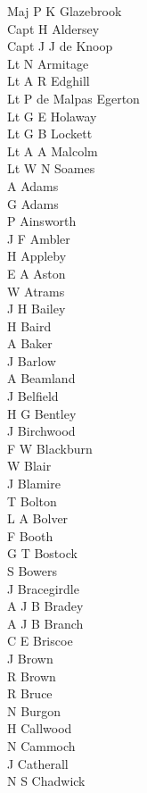 \begin{multicols}{3}
  \small
  \noindent
  Maj P K Glazebrook \\
  Capt H Aldersey \\
  Capt J J de Knoop \\
  Lt N Armitage \\
  Lt A R Edghill \\
  Lt P de Malpas Egerton \\
  Lt G E Holaway \\
  Lt G B Lockett \\
  Lt A A Malcolm \\
  Lt W N Soames \\
  A Adams \\
  G Adams \\
  P Ainsworth \\
  J F Ambler \\
  H Appleby \\
  E A Aston \\
  W Atrams \\
  J H Bailey \\
  H Baird \\
  A Baker \\
  J Barlow \\
  A Beamland \\
  J Belfield \\
  H G Bentley \\
  J Birchwood \\
  F W Blackburn \\
  W Blair \\
  J Blamire \\
  T Bolton \\
  L A Bolver \\
  F Booth \\
  G T Bostock \\
  S Bowers \\
  J Bracegirdle \\
  A J B Bradey \\
  A J B Branch \\
  C E Briscoe \\
  J Brown \\
  R Brown \\
  R Bruce \\
  N Burgon \\
  H Callwood \\
  N Cammoch \\
  J Catherall \\
  N S Chadwick \\

\end{multicols}
